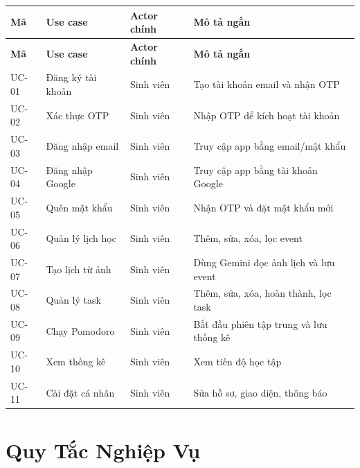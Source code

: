 \documentclass[12pt,a4paper]{report}
\begin{document}
\begin{longtable}{|>{\raggedright\arraybackslash}p{}|>{\raggedright\arraybackslash}p{}|>{\raggedright\arraybackslash}p{}|>{\raggedright\arraybackslash}p{}|}
\hline
\textbf{Mã} & \textbf{Use case} & \textbf{Actor chính} & \textbf{Mô tả ngắn} \\ \hline
\endfirsthead
\hline
\textbf{Mã} & \textbf{Use case} & \textbf{Actor chính} & \textbf{Mô tả ngắn} \\ \hline
\endhead
UC-01 & Đăng ký tài khoản & Sinh viên & Tạo tài khoản email và nhận OTP \\ \hline
UC-02 & Xác thực OTP & Sinh viên & Nhập OTP để kích hoạt tài khoản \\ \hline
UC-03 & Đăng nhập email & Sinh viên & Truy cập app bằng email/mật khẩu \\ \hline
UC-04 & Đăng nhập Google & Sinh viên & Truy cập app bằng tài khoản Google \\ \hline
UC-05 & Quên mật khẩu & Sinh viên & Nhận OTP và đặt mật khẩu mới \\ \hline
UC-06 & Quản lý lịch học & Sinh viên & Thêm, sửa, xóa, lọc event \\ \hline
UC-07 & Tạo lịch từ ảnh & Sinh viên & Dùng Gemini đọc ảnh lịch và lưu event \\ \hline
UC-08 & Quản lý task & Sinh viên & Thêm, sửa, xóa, hoàn thành, lọc task \\ \hline
UC-09 & Chạy Pomodoro & Sinh viên & Bắt đầu phiên tập trung và lưu thống kê \\ \hline
UC-10 & Xem thống kê & Sinh viên & Xem tiến độ học tập \\ \hline
UC-11 & Cài đặt cá nhân & Sinh viên & Sửa hồ sơ, giao diện, thông báo \\ \hline
\end{longtable}

\section{Quy Tắc Nghiệp Vụ}
\end{document}
